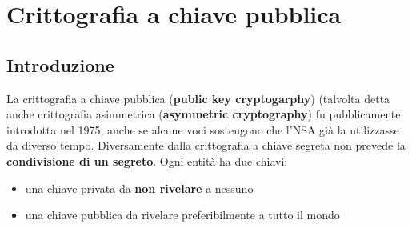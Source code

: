 \chapter{Crittografia a chiave pubblica} \label{ch:publickey}
\section{Introduzione}
La crittografia a chiave pubblica (\textbf{public key cryptogarphy}) (talvolta detta anche crittografia asimmetrica (\textbf{asymmetric cryptography}) fu pubblicamente introdotta nel 1975, anche se alcune voci sostengono che l'NSA già la utilizzasse da diverso tempo. Diversamente dalla crittografia a chiave segreta non prevede la \textbf{condivisione di un segreto}. Ogni entità ha due chiavi:
\begin{itemize}
	\item una chiave privata da \textbf{non rivelare} a nessuno
	\item una chiave pubblica da rivelare preferibilmente a tutto il mondo
\end{itemize}


